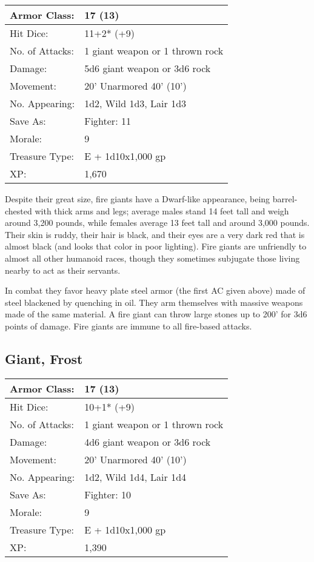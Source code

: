 \documentclass[a4paper,twoside,openany,10pt]{book}
\begin{document}
\begin{multicols}{2}
\begin{center}
	\begin{tabularx}{0.48\textwidth}{@{}lX@{}}
Armor Class: & 17 (13) \\\hline
Hit Dice: & 11+2* (+9) \\\hline
No. of Attacks: & 1 giant weapon or 1 thrown rock \\\hline
Damage: & 5d6 giant weapon or 3d6 rock \\\hline
Movement: & 20' Unarmored 40'
(10') \\\hline
No. Appearing: & 1d2, Wild 1d3, Lair 1d3 \\\hline
Save As: & Fighter: 11 \\\hline
Morale: & 9 \\\hline
Treasure Type: & E + 1d10x1,000 gp \\\hline
XP: & 1,670 \\\hline
\end{tabularx}\medskip

\end{center}

Despite their great size, fire giants have a Dwarf-like appearance, being barrel-chested with thick arms and legs; average males stand 14 feet tall and weigh around 3,200 pounds, while females average 13 feet tall and around 3,000 pounds.  Their skin is ruddy, their hair is black, and their eyes are a very dark red that is almost black (and looks that color in poor lighting). Fire giants are unfriendly to almost all other humanoid races, though they sometimes subjugate those living nearby to act as their servants. 

In combat they favor heavy plate steel armor (the first AC given above) made of steel blackened by quenching in oil. They arm themselves with massive weapons made of the same material. A fire giant can throw large stones up to 200' for 3d6 points of damage. Fire giants are immune to all fire-based attacks.



\subsection*{Giant, Frost}\label{giant-frost}

\begin{tabularx}{0.48\textwidth}{@{}lX@{}}
Armor Class: & 17 (13) \\\hline
Hit Dice: & 10+1* (+9) \\\hline
No. of Attacks: & 1 giant weapon or 1 thrown rock \\\hline
Damage: & 4d6 giant weapon or 3d6 rock \\\hline
Movement: & 20' Unarmored 40'
(10') \\\hline
No. Appearing: & 1d2, Wild 1d4, Lair 1d4 \\\hline
Save As: & Fighter: 10 \\\hline
Morale: & 9 \\\hline
Treasure Type: & E + 1d10x1,000 gp \\\hline
XP: & 1,390 \\\hline
\end{tabularx}\medskip


\end{multicols}
\end{document}
